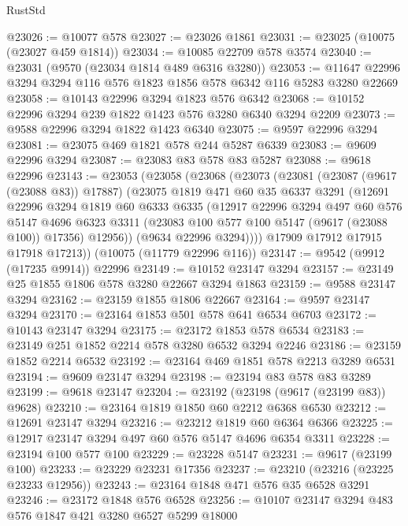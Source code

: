 \begin{lexlean}{RustStd}
\begin{coremodule}
@23026 := @10077 @578
@23027 := @23026 @1861
@23031 := @23025 (@10075 (@23027 @459 @1814))
@23034 := @10085 @22709 @578 @3574
@23040 := @23031 (@9570 (@23034 @1814 @489 @6316 @3280))
@23053 := @11647 @22996 @3294 @3294 @116 @576 @1823 @1856 @578 @6342 @116 @5283 @3280 @22669
@23058 := @10143 @22996 @3294 @1823 @576 @6342
@23068 := @10152 @22996 @3294 @239 @1822 @1423 @576 @3280 @6340 @3294 @2209
@23073 := @9588 @22996 @3294 @1822 @1423 @6340
@23075 := @9597 @22996 @3294
@23081 := @23075 @469 @1821 @578 @244 @5287 @6339
@23083 := @9609 @22996 @3294
@23087 := @23083 @83 @578 @83 @5287
@23088 := @9618 @22996
@23143 := @23053
    (@23058
      (@23068
        (@23073
          (@23081
            (@23087 (@9617 (@23088 @83)) @17887)
            (@23075
              @1819
              @471
              @60
              @35
              @6337
              @3291
              (@12691
                @22996
                @3294
                @1819
                @60
                @6333
                @6335
                (@12917
                  @22996
                  @3294
                  @497
                  @60
                  @576
                  @5147
                  @4696
                  @6323
                  @3311
                  (@23083 @100 @577 @100 @5147 (@9617 (@23088 @100)) @17356)
                  @12956))
              (@9634 @22996 @3294))))
        @17909
        @17912
        @17915
        @17918
        @17213))
    (@10075 (@11779 @22996 @116))
@23147 := @9542 (@9912 (@17235 @9914)) @22996
@23149 := @10152 @23147 @3294
@23157 := @23149 @25 @1855 @1806 @578 @3280 @22667 @3294 @1863
@23159 := @9588 @23147 @3294
@23162 := @23159 @1855 @1806 @22667
@23164 := @9597 @23147 @3294
@23170 := @23164 @1853 @501 @578 @641 @6534 @6703
@23172 := @10143 @23147 @3294
@23175 := @23172 @1853 @578 @6534
@23183 := @23149 @251 @1852 @2214 @578 @3280 @6532 @3294 @2246
@23186 := @23159 @1852 @2214 @6532
@23192 := @23164 @469 @1851 @578 @2213 @3289 @6531
@23194 := @9609 @23147 @3294
@23198 := @23194 @83 @578 @83 @3289
@23199 := @9618 @23147
@23204 := @23192 (@23198 (@9617 (@23199 @83)) @9628)
@23210 := @23164 @1819 @1850 @60 @2212 @6368 @6530
@23212 := @12691 @23147 @3294
@23216 := @23212 @1819 @60 @6364 @6366
@23225 := @12917 @23147 @3294 @497 @60 @576 @5147 @4696 @6354 @3311
@23228 := @23194 @100 @577 @100
@23229 := @23228 @5147
@23231 := @9617 (@23199 @100)
@23233 := @23229 @23231 @17356
@23237 := @23210 (@23216 (@23225 @23233 @12956))
@23243 := @23164 @1848 @471 @576 @35 @6528 @3291
@23246 := @23172 @1848 @576 @6528
@23256 := @10107 @23147 @3294 @483 @576 @1847 @421 @3280 @6527 @5299 @18000

\end{coremodule}
\end{lexlean}
